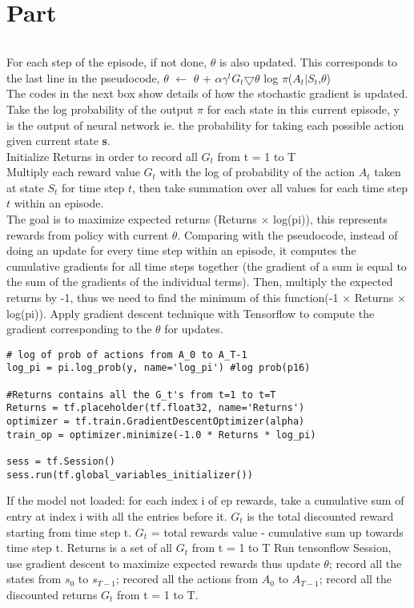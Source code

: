 \documentclass{article}
\newcommand{\enterProblemHeader}[1]{
}
\newcommand{\exitProblemHeader}[1]{
}
\newcounter{homeworkProblemCounter} %
\newcommand{\homeworkProblemName}{}
\newenvironment{homeworkProblem}[1][Part \arabic{homeworkProblemCounter}]{ %
\stepcounter{homeworkProblemCounter} %
\renewcommand{\homeworkProblemName}{#1} %
\section{\homeworkProblemName} %
\enterProblemHeader{\homeworkProblemName} %
}{
\exitProblemHeader{\homeworkProblemName} %
}
\begin{document}
\begin{homeworkProblem}
\begin{enumerate}
\begin{lstlisting}
\end{lstlisting} \vspace{10mm}

For each step of the episode, if not done, $\theta$ is also updated. This corresponds to the last line in the pseudocode, $\theta$ $\leftarrow$ $\theta$ + $\alpha$$\gamma^t$$G_t$$\bigtriangledown$$\theta$ log $\pi$($A_t$$\mid$$S_t$,$\theta$)\\
The codes in the next box show details of how the stochastic gradient is updated.\\

\noindent  Take the log probability of the output $\pi$ for each state in this current episode, y is the output of neural network ie. the probability for taking each possible action given current state \textbf{s}. \\
Initialize Returns in order to record all $G_t$ from t = 1 to T\\
Multiply each reward value $G_{t}$ with the log of probability of the action $A_{t}$ taken at state $S_{t}$ for time step $t$, then take summation over all values for each time step $t$ within an episode.\\
The goal is to maximize expected returns (Returns $\times$ log(pi)), this represents rewards from policy with current $\theta$. Comparing with the pseudocode, instead of doing an update for every time step within an episode, it computes the cumulative gradients for all time steps together (the gradient of a sum is equal to the sum of the gradients of the individual terms). Then, multiply the expected returns by -1, thus we need to find the minimum of this function(-1 $\times$ Returns $\times$ log(pi)). Apply gradient descent technique with Tensorflow to compute the gradient corresponding to the $\theta$ for updates.



\begin{lstlisting}
# log of prob of actions from A_0 to A_T-1
log_pi = pi.log_prob(y, name='log_pi') #log prob(p16)

#Returns contains all the G_t's from t=1 to t=T     
Returns = tf.placeholder(tf.float32, name='Returns')
optimizer = tf.train.GradientDescentOptimizer(alpha)
train_op = optimizer.minimize(-1.0 * Returns * log_pi)

sess = tf.Session()
sess.run(tf.global_variables_initializer())

\end{lstlisting}

\noindent  If the model not loaded: for each index i of ep rewards, take a cumulative sum of entry at index i with all the entries before it. $G_t$ is the total discounted reward starting from time step t. $G_t$  = total rewards value - cumulative sum up towards time step t. Returns is a set of all $G_t$ from t = 1 to T
Run tensonflow Session, use gradient descent to maximize expected rewards thus update $\theta$; record all the states from $s_0$ to $s_{T-1}$; recored all the actions from $A_0$ to $A_{T-1}$; record all the discounted returns $G_t$ from t = 1 to T.


\end{enumerate}
\end{homeworkProblem}
\end{document}
